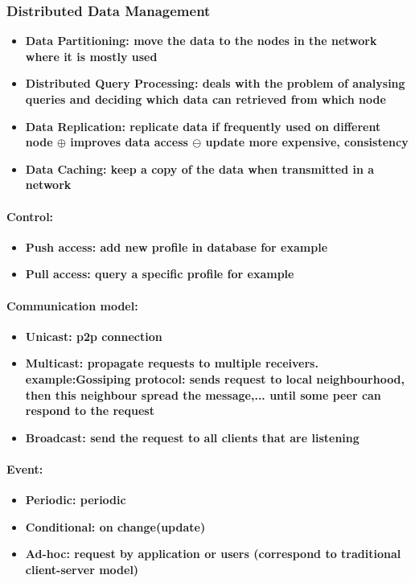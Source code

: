 \subsubsection{Distributed Data Management}
\begin{itemize}
\item \bf{Data Partitioning:} move the data to the nodes in the network where it is mostly used
\item \bf{Distributed Query Processing:}  deals with the problem of analysing queries and deciding which data can retrieved from which node
\item \bf{Data Replication:} replicate data if frequently used on different node $\oplus$ improves data access $\ominus$ update more expensive, consistency
\item \bf{Data Caching:} keep a copy of the data when transmitted in a network
\end{itemize}

\paragraph{Control:}
\begin{itemize}
\item \bf{Push access:} add new profile in database for example
\item \bf{Pull access:} query a specific profile for example
\end{itemize}


\paragraph{Communication model:}
\begin{itemize}
\item \bf{Unicast:} p2p connection
\item \bf{Multicast:} propagate requests to multiple receivers. example:\bf{Gossiping protocol:} sends request to local neighbourhood, then this neighbour spread the message,... until some peer can respond to the request
\item \bf{Broadcast:} send the request to all clients that are listening
\end{itemize}

\paragraph{Event:}
\begin{itemize}
\item \bf{Periodic:} periodic
\item \bf{Conditional:} on change(update)
\item \bf{Ad-hoc:} request by application or users (correspond to traditional client-server model)
\end{itemize}

